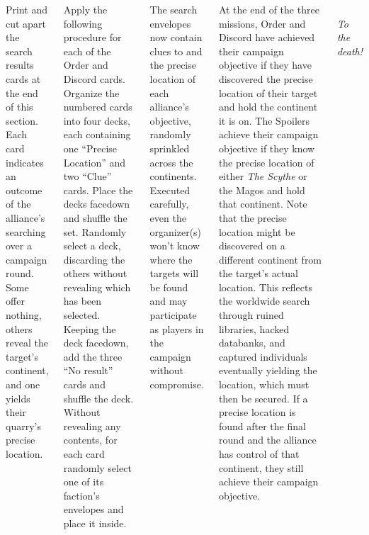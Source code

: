 \begin{columns}
Print and cut apart the search results cards at the end of this
section.  Each card indicates an outcome of the alliance's searching
over a campaign round.  Some offer nothing, others reveal the target's
continent, and one yields their quarry's precise location.

Apply the following procedure for each of the Order and Discord cards.
Organize the numbered cards into four decks, each containing one
``Precise Location'' and two ``Clue'' cards.  Place the decks facedown
and shuffle the set.  Randomly select a deck, discarding the others
without revealing which has been selected.  Keeping the deck facedown,
add the three ``No result'' cards and shuffle the deck.  Without
revealing any contents, for each card randomly select one of its
faction's envelopes and place it inside.

The search envelopes now contain clues to and the precise location of
each alliance's objective, randomly sprinkled across the continents.
Executed carefully, even the organizer(s) won't know where the targets
will be found and may participate as players in the campaign without
compromise.


At the end of the three missions, Order and Discord have achieved
their campaign objective if they have discovered the precise location
of their target and hold the continent it is on.  The Spoilers achieve
their campaign objective if they know the precise location of either
\emph{The Scythe} or the Magos and hold that continent.  Note that the
precise location might be discovered on a different continent from the
target's actual location.  This reflects the worldwide search through
ruined libraries, hacked databanks, and captured individuals
eventually yielding the location, which must then be secured.  If a
precise location is found after the final round and the alliance has
control of that continent, they still achieve their campaign
objective.

\vfill
\noindent%
\begin{minipage}[t]{1.0\linewidth}\centering\small\it%
\\
To the death!
\end{minipage}


\end{columns}
